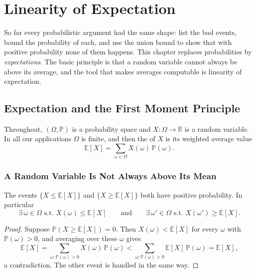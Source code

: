 \chapter{Linearity of Expectation}


So far every probabilistic argument had the same shape: list the bad events, bound the probability of each, and use the union bound to show that with positive probability none of them happens. This chapter replaces probabilities by \emph{expectations}. The basic principle is that a random variable cannot always be above its average, and the tool that makes averages computable is linearity of expectation.

\section{Expectation and the First Moment Principle}\label{sec:first-moment}

Throughout, \((\Omega, \mathbb{P})\) is a probability space and \(X \colon \Omega \to \mathbb{R}\) is a random variable. In all our applications \(\Omega\) is finite, and then the  of \(X\) is its weighted average value
\[
    \mathbb{E}[X] = \sum_{\omega \in \Omega} X(\omega) \, \mathbb{P}(\omega).
\]

\subsection{A Random Variable Is Not Always Above Its Mean}

\begin{lemma}\label{lem:first-moment}
    The events \(\{X \le \mathbb{E}[X]\}\) and \(\{X \ge \mathbb{E}[X]\}\) both have positive probability. In particular
    \[
        \exists\, \omega \in \Omega \text{ s.t.\ } X(\omega) \le \mathbb{E}[X]
        \qquad \text{and} \qquad
        \exists\, \omega' \in \Omega \text{ s.t.\ } X(\omega') \ge \mathbb{E}[X].
    \]
\end{lemma}

\begin{proof}
    Suppose \(\mathbb{P}(X \ge \mathbb{E}[X]) = 0\). Then \(X(\omega) < \mathbb{E}[X]\) for every \(\omega\) with \(\mathbb{P}(\omega) > 0\), and averaging over these \(\omega\) gives
    \[
        \mathbb{E}[X] = \sum_{\omega : \mathbb{P}(\omega) > 0} X(\omega) \, \mathbb{P}(\omega) < \sum_{\omega : \mathbb{P}(\omega) > 0} \mathbb{E}[X] \, \mathbb{P}(\omega) = \mathbb{E}[X],
    \]
    a contradiction. The other event is handled in the same way.
\end{proof}

